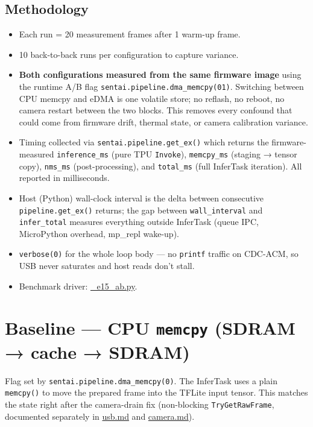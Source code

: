 \subsection{Methodology}\label{methodology}

\begin{itemize}
\tightlist
\item
  Each run = 20 measurement frames after 1 warm-up frame.
\item
  10 back-to-back runs per configuration to capture variance.
\item
  \textbf{Both configurations measured from the same firmware image}
  using the runtime A/B flag
  \texttt{sentai.pipeline.dma\_memcpy(0\textbar{}1)}. Switching between
  CPU memcpy and eDMA is one volatile store; no reflash, no reboot, no
  camera restart between the two blocks. This removes every confound
  that could come from firmware drift, thermal state, or camera
  calibration variance.
\item
  Timing collected via \texttt{sentai.pipeline.get\_ex()} which returns
  the firmware-measured \texttt{inference\_ms} (pure TPU
  \texttt{Invoke}), \texttt{memcpy\_ms} (staging → tensor copy),
  \texttt{nms\_ms} (post-processing), and \texttt{total\_ms} (full
  InferTask iteration). All reported in milliseconds.
\item
  Host (Python) wall-clock interval is the delta between consecutive
  \texttt{pipeline.get\_ex()} returns; the gap between
  \texttt{wall\_interval} and \texttt{infer\_total} measures everything
  outside InferTask (queue IPC, MicroPython overhead, mp\_repl wake-up).
\item
  \texttt{verbose(0)} for the whole loop body --- no \texttt{printf}
  traffic on CDC-ACM, so USB never saturates and host reads don't stall.
\item
  Benchmark driver: \href{../_e15_ab.py}{\_e15\_ab.py}.
\end{itemize}

\section{\texorpdfstring{Baseline --- CPU \texttt{memcpy} (SDRAM → cache
→
SDRAM)}{Baseline --- CPU memcpy (SDRAM → cache → SDRAM)}}\label{baseline-cpu-memcpy-sdram-cache-sdram}

Flag set by \texttt{sentai.pipeline.dma\_memcpy(0)}. The InferTask uses
a plain \texttt{memcpy()} to move the prepared frame into the TFLite
input tensor. This matches the state right after the camera-drain fix
(non-blocking \texttt{TryGetRawFrame}, documented separately in
\url{usb.md} and \url{camera.md}).

